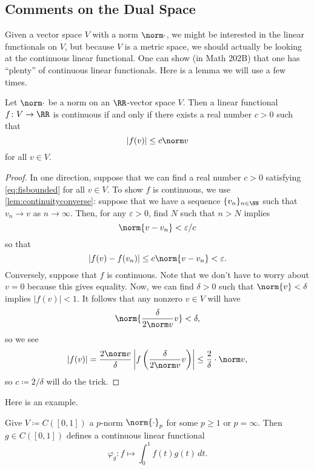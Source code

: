 \documentclass[../notes.tex]{subfiles}
\begin{document}
\subsection{Comments on the Dual Space}
Given a vector space $V$ with a norm $\norm\cdot$, we might be interested in the linear functionals on $V$, but because $V$ is a metric space, we should actually be looking at the continuous linear functional. One can show (in Math 202B) that one has ``plenty'' of continuous linear functionals. Here is a lemma we will use a few times.
\begin{lemma} \label{lem:boundediffcont}
	Let $\norm\cdot$ be a norm on an $\RR$-vector space $V$. Then a linear functional $f\colon V\to\RR$ is continuous if and only if there exists a real number $c>0$ such that
	\begin{equation}
		|f(v)|\le c\norm v \label{eq:fisbounded}
	\end{equation}
	for all $v\in V$.
\end{lemma}
\begin{proof}
	In one direction, suppose that we can find a real number $c>0$ satisfying \autoref{eq:fisbounded} for all $v\in V$. To show $f$ is continuous, we use \autoref{lem:continuityconverse}: suppose that we have a sequence $\{v_n\}_{n\in\NN}$ such that $v_n\to v$ as $n\to\infty$. Then, for any $\varepsilon>0$, find $N$ such that $n>N$ implies
	\[\norm{v-v_n}<\varepsilon/c\]
	so that
	\[|f(v)-f(v_n)|\le c\norm{v-v_n}<\varepsilon.\]
	Conversely, suppose that $f$ is continuous. Note that we don't have to worry about $v=0$ because this gives equality. Now, we can find $\delta>0$ such that $\norm{v}<\delta$ implies $|f(v)|<1$. It follows that any nonzero $v\in V$ will have
	\[\norm{\frac\delta{2\norm v}v}<\delta,\]
	so we see
	\[|f(v)|=\frac{2\norm v}\delta\left|f\left(\frac\delta{2\norm v}v\right)\right|\le\frac2\delta\cdot\norm v,\]
	so $c\coloneqq2/\delta$ will do the trick.
\end{proof}
Here is an example.
\begin{exe}
	Give $V\coloneqq C([0,1])$ a $p$-norm $\norm{\cdot}_p$ for some $p\ge1$ or $p=\infty$. Then $g\in C([0,1])$ defines a continuous linear functional
	\[\varphi_g\colon f\mapsto\int_0^1f(t)g(t)\,dt.\]
\end{exe}
\end{document}
